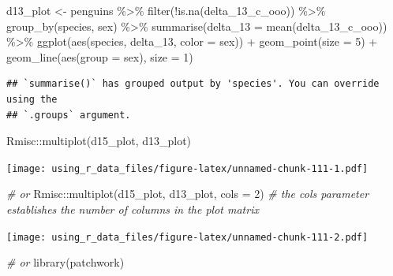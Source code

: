 \documentclass[
]{book}
\newenvironment{Shaded}{\begin{snugshade}}{\end{snugshade}}
\newcommand{\AttributeTok}[1]{\textcolor[rgb]{0.77,0.63,0.00}{#1}}
\newcommand{\CommentTok}[1]{\textcolor[rgb]{0.56,0.35,0.01}{\textit{#1}}}
\newcommand{\DecValTok}[1]{\textcolor[rgb]{0.00,0.00,0.81}{#1}}
\newcommand{\FunctionTok}[1]{\textcolor[rgb]{0.00,0.00,0.00}{#1}}
\newcommand{\NormalTok}[1]{#1}
\newcommand{\OtherTok}[1]{\textcolor[rgb]{0.56,0.35,0.01}{#1}}
\newcommand{\SpecialCharTok}[1]{\textcolor[rgb]{0.00,0.00,0.00}{#1}}
\begin{document}
\begin{Shaded}
\begin{Highlighting}[]
\NormalTok{d13\_plot }\OtherTok{\textless{}{-}}\NormalTok{ penguins }\SpecialCharTok{\%\textgreater{}\%} 
  \FunctionTok{filter}\NormalTok{(}\SpecialCharTok{!}\FunctionTok{is.na}\NormalTok{(delta\_13\_c\_ooo)) }\SpecialCharTok{\%\textgreater{}\%} 
  \FunctionTok{group\_by}\NormalTok{(species, sex) }\SpecialCharTok{\%\textgreater{}\%} 
  \FunctionTok{summarise}\NormalTok{(}\AttributeTok{delta\_13 =} \FunctionTok{mean}\NormalTok{(delta\_13\_c\_ooo)) }\SpecialCharTok{\%\textgreater{}\%} 
  \FunctionTok{ggplot}\NormalTok{(}\FunctionTok{aes}\NormalTok{(species, delta\_13, }\AttributeTok{color =}\NormalTok{ sex)) }\SpecialCharTok{+}
  \FunctionTok{geom\_point}\NormalTok{(}\AttributeTok{size =} \DecValTok{5}\NormalTok{) }\SpecialCharTok{+}
  \FunctionTok{geom\_line}\NormalTok{(}\FunctionTok{aes}\NormalTok{(}\AttributeTok{group =}\NormalTok{ sex), }\AttributeTok{size =} \DecValTok{1}\NormalTok{)}
\end{Highlighting}
\end{Shaded}

\begin{verbatim}
## `summarise()` has grouped output by 'species'. You can override using the
## `.groups` argument.
\end{verbatim}

\begin{Shaded}
\begin{Highlighting}[]
\NormalTok{Rmisc}\SpecialCharTok{::}\FunctionTok{multiplot}\NormalTok{(d15\_plot, d13\_plot)}
\end{Highlighting}
\end{Shaded}

\texttt{[image: using\_r\_data\_files/figure-latex/unnamed-chunk-111-1.pdf]}

\begin{Shaded}
\begin{Highlighting}[]
\CommentTok{\# or}
\NormalTok{Rmisc}\SpecialCharTok{::}\FunctionTok{multiplot}\NormalTok{(d15\_plot, d13\_plot, }\AttributeTok{cols =} \DecValTok{2}\NormalTok{)  }\CommentTok{\# the cols parameter establishes the number of columns in the plot matrix}
\end{Highlighting}
\end{Shaded}

\texttt{[image: using\_r\_data\_files/figure-latex/unnamed-chunk-111-2.pdf]}

\begin{Shaded}
\begin{Highlighting}[]
\CommentTok{\# or}
\FunctionTok{library}\NormalTok{(patchwork)}
\end{Highlighting}
\end{Shaded}
\end{document}

